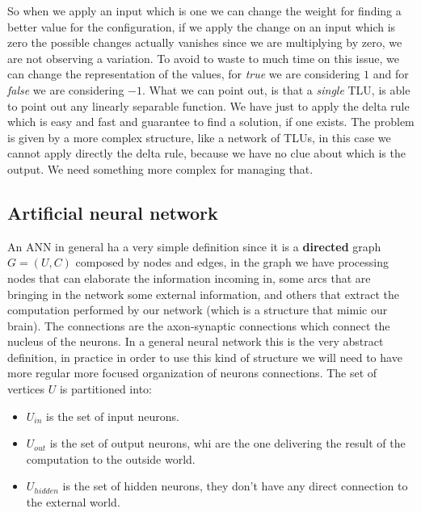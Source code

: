 \documentclass{article}
\begin{document}
\newline\newline
So when we apply an input which is one we can change the weight for finding a better value
for the configuration, if we apply the change on an input which is zero the possible changes
actually vanishes since we are multiplying by zero, we are not observing a variation.
\newline\newline
To avoid to waste to much time on this issue, we can change the representation of the values,
for \textit{true} we are considering $1$ and for \textit{false} we are considering $-1$.
\newline\newline
What we can point out, is that a \textit{single} TLU, is able to point out any linearly
separable function. We have just to apply the delta rule which is easy and fast and
guarantee to find a solution, if one exists.
\newline\newline
The problem is given by a more complex structure, like a network of TLUs,
in this case we cannot apply directly the delta rule, because we have no clue
about which is the output. We need something more complex for managing that.

\subsection{Artificial neural network}
An ANN in general ha a very simple definition since it is a \textbf{directed}
graph $G=(U,C)$ composed by nodes and edges, in the graph we have processing
nodes that can elaborate the information incoming in, some arcs that
are bringing in the network some external information, and others that extract
the computation performed by our network (which is a structure that mimic our
brain).
\newline\newline
The connections are the axon-synaptic connections which connect the nucleus of the
neurons. In a general neural network this is the very abstract definition, in practice
in order to use this kind of structure we will need to have more regular more focused
organization of neurons connections.
\newline\newline
The set of vertices $U$ is partitioned into:
\begin{itemize}
    \item $U_{in}$ is the set of input neurons.
    \item $U_{out}$ is the set of output neurons, whi are the one delivering the
          result of the computation to the outside world.
    \item $U_{hidden}$ is the set of hidden neurons, they don't have any direct
          connection to the external world.
\end{itemize}
\end{document}
